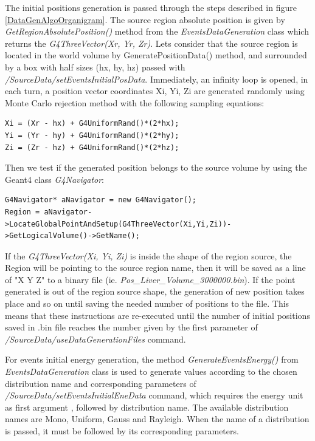 \documentclass[letterpaper,12pt]{article}
\begin{document}
The initial positions generation is passed through the steps described in figure \ref{DataGenAlgoOrganigram}. The source region absolute position is given by \textit{GetRegionAbsolutePosition()} method from the \textit{EventsDataGeneration} class which returns the \textit{G4ThreeVector(Xr, Yr, Zr)}. Lets consider that the source region is located in the world volume by GeneratePositionData() method, and surrounded by a box with half sizes (hx, hy, hz) passed with \textit{/SourceData/setEventsInitialPosData}. Immediately, an infinity loop is opened, in each turn, a position vector coordinates Xi, Yi, Zi are generated randomly using Monte Carlo rejection method \cite{ExplorMonteCarlo} with the following sampling equations:

\lstset{style=MyCodeStyle}

\begin{lstlisting}
Xi = (Xr - hx) + G4UniformRand()*(2*hx);
Yi = (Yr - hy) + G4UniformRand()*(2*hy);
Zi = (Zr - hz) + G4UniformRand()*(2*hz);
\end{lstlisting}

Then we test if the generated position belongs to the source volume by using the Geant4 class \textit{G4Navigator}:

\begin{lstlisting}
G4Navigator* aNavigator = new G4Navigator();
Region = aNavigator->LocateGlobalPointAndSetup(G4ThreeVector(Xi,Yi,Zi))->GetLogicalVolume()->GetName();
\end{lstlisting}

If the \textit{G4ThreeVector(Xi, Yi, Zi)} is inside the shape of the region source, the Region will be pointing to the source region name, then it will be saved as a line of "X Y Z" to a binary file (ie. \textit{Pos\_Liver\_Volume\_3000000.bin}). If the point generated is out of the region source shape, the generation of new position takes place and so on until saving the needed number of positions to the file. This means that these instructions are re-executed until the number of initial positions saved in .bin file reaches the number given by the first parameter of \textit{/SourceData/useDataGenerationFiles} command. 

For events initial energy generation, the method \textit{GenerateEventsEnergy()} from \textit{EventsDataGeneration} class is used to generate values according to the chosen distribution name and corresponding parameters of \textit{/SourceData/setEventsInitialEneData} command, which requires the energy unit as first argument , followed by distribution name. The available distribution names are Mono, Uniform, Gauss and Rayleigh. When the name of a distribution is passed, it must be followed by its corresponding parameters.
 
\end{document}
